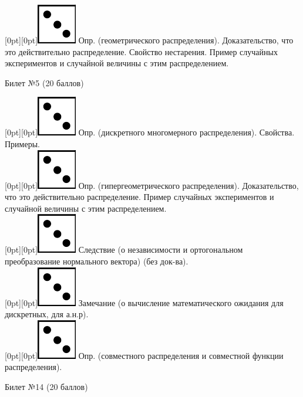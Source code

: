 \documentclass[10pt]{article}
\begin{document}
\raisebox{-1pt}[0pt][0pt]{\includegraphics[width=0.02\linewidth]{3.png}}  Опр. (геометрического распределения). Доказательство, что это действительно распределение. Свойство нестарения. Пример случайных экспериментов и случайной величины с этим распределением. \\      

\begin{center} {\Large Билет №5 (20 баллов)} \end{center}

\raisebox{-1pt}[0pt][0pt]{\includegraphics[width=0.02\linewidth]{3.png}} Опр. (дискретного многомерного распределения). Свойства. Примеры. \\

\raisebox{-1pt}[0pt][0pt]{\includegraphics[width=0.02\linewidth]{3.png}} Опр. (гипергеометрического распределения). Доказательство, что это действительно распределение. Пример случайных экспериментов и случайной величины с этим распределением. \\      

\raisebox{-1pt}[0pt][0pt]{\includegraphics[width=0.02\linewidth]{3.png}} Следствие (о независимости и  ортогональном преобразование нормального вектора) (без док-ва). \\ 

\raisebox{-1pt}[0pt][0pt]{\includegraphics[width=0.02\linewidth]{3.png}} Замечание (о вычисление  математического ожидания для дискретных, для а.н.р). \\

\raisebox{-1pt}[0pt][0pt]{\includegraphics[width=0.02\linewidth]{3.png}} Опр. (совместного распределения и  совместной функции распределения). \\

\begin{center} {\Large Билет №14 (20 баллов)} \end{center}
\end{document}
